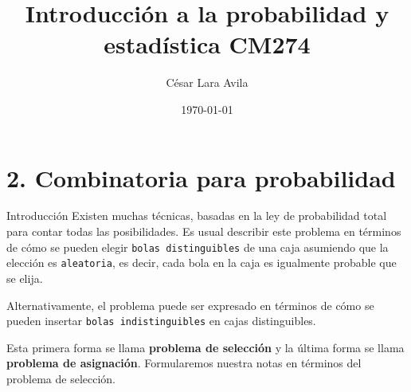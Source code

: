 \documentclass[10pt]{beamer}
\title{Introducci\'on a la probabilidad y estad\'istica CM274}
\date{\today}
\author{C\'esar Lara Avila}
\institute{\url{https://github.com/C-Lara}}
\begin{document}
  \maketitle
  \section{2. Combinatoria para probabilidad }
  
\begin{frame}{Introducci\'on}
Existen muchas t\'ecnicas, basadas en la ley de probabilidad total para contar todas las posibilidades. Es usual describir este problema en t\'erminos de c\'omo se pueden elegir \texttt{bolas distinguibles} de una caja  asumiendo que la elecci\'on es \texttt{aleatoria}, es decir, cada bola en la caja es igualmente probable que se elija.

\vspace{0.2cm}

Alternativamente, el problema puede ser expresado en t\'erminos de c\'omo se pueden insertar \texttt{bolas indistinguibles} en cajas distinguibles. 

\vspace{0.2cm}

Esta primera forma  se llama \textbf{problema de selecci\'on}  y la  \'ultima forma  se llama \textbf{problema de asignaci\'on}. Formularemos nuestra notas en t\'erminos del problema de selecci\'on.
\end{frame}
  
\end{document}
